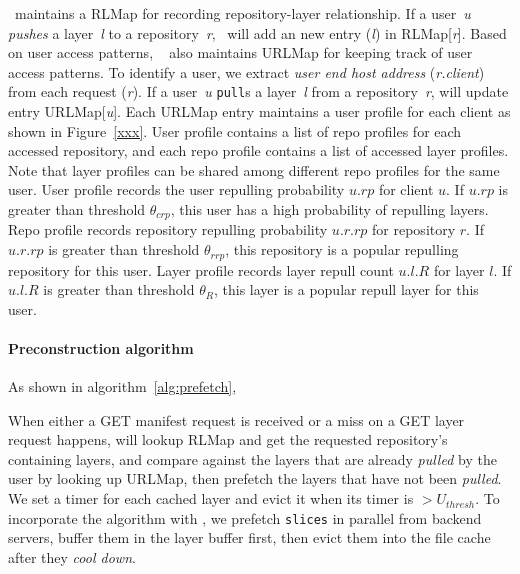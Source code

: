 \preconstructcachename~maintains a RLMap for recording repository-layer relationship.
If a user~\emph{u} \emph{pushes} a  layer~\emph{l} to a repository~\emph{r},
\preconstructcachename~will add an new entry (\emph{l}) in RLMap[\emph{r}]. 
Based on user access patterns,
\preconstructcachename~ also maintains URLMap for keeping track of user access patterns.
To identify a user, 
we extract \emph{user end host address} (\emph{r.client}) from each request (\emph{r}). 
If a user~\emph{u} \texttt{pull}s a layer~\emph{l} from a repository~\emph{r},
\preconstructcachename will update entry URLMap[\emph{u}].
Each URLMap entry maintains a user profile for each client as shown in Figure~\ref{xxx}.
User profile contains a list of repo profiles for each accessed repository,
and each repo profile contains a list of accessed layer profiles.
Note that layer profiles can be shared among different repo profiles for the same user.
User profile records the user repulling probability $u.rp$ for client $u$.
If $u.rp$ is greater than threshold $\theta_{crp}$, this user has a high probability of repulling layers.
Repo profile records repository repulling probability $u.r.rp$ for repository $r$.
If $u.r.rp$ is greater than threshold $\theta_{rrp}$, this repository is a popular repulling repository for this user.
Layer profile records layer repull count $u.l.R$ for layer $l$.
If $u.l.R$ is greater than threshold $\theta_{R}$, this layer is a popular repull layer for this user.

\paragraph{Preconstruction algorithm}

As shown in algorithm~\ref{alg:prefetch}, 

When either a GET manifest request is received or 
a miss on a GET layer request happens,
\sysname will lookup RLMap and get the requested repository's containing layers,
and compare against the layers that are already \emph{pulled} by the user by looking up URLMap,
then prefetch the layers that have not been \emph{pulled}. 
We set a timer for each cached layer and evict it when its timer is $>U_{thresh}$.
To incorporate the algorithm with \sysname,
we prefetch \texttt{slices} in parallel from backend servers,  
buffer them in the layer buffer first, then evict them into the file cache after they \emph{cool down}.

